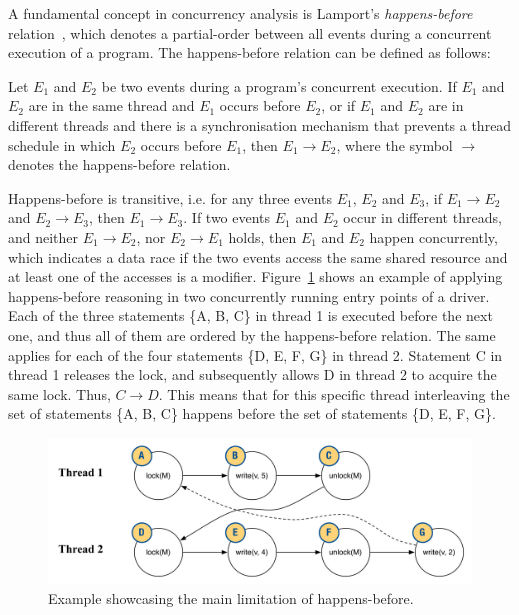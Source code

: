 A fundamental concept in concurrency analysis is Lamport's \emph{happens-before} relation~\cite{lamport1978time}, which denotes a partial-order between all events during a concurrent execution of a program. The happens-before relation can be defined as follows:

\begin{definition}
\label{definition:datarace}
Let $E_1$ and $E_2$ be two events during a program's concurrent execution. If $E_1$ and $E_2$ are in the same thread and $E_1$ occurs before $E_2$, or if $E_1$ and $E_2$ are in different threads and there is a synchronisation mechanism that prevents a thread schedule in which $E_2$ occurs before $E_1$, then $E_1 \rightarrow E_2$, where the symbol $\rightarrow$ denotes the happens-before relation.
\end{definition}

Happens-before is transitive, i.e. for any three events $E_1$, $E_2$ and $E_3$, if $E_1 \rightarrow E_2$ and $E_2 \rightarrow E_3$, then $E_1 \rightarrow E_3$. If two events $E_1$ and $E_2$ occur in different threads, and neither $E_1 \rightarrow E_2$, nor $E_2 \rightarrow E_1$ holds, then $E_1$ and $E_2$ happen concurrently, which indicates a data race if the two events access the same shared resource and at least one of the accesses is a modifier. Figure~\ref{happens_before} shows an example of applying happens-before reasoning in two concurrently running entry points of a driver. Each of the three statements \{A, B, C\} in thread 1 is executed before the next one, and thus all of them are ordered by the happens-before relation. The same applies for each of the four statements \{D, E, F, G\} in thread 2. Statement C in thread 1 releases the lock, and subsequently allows D in thread 2 to acquire the same lock. Thus, $C \rightarrow D$. This means that for this specific thread interleaving the set of statements \{A, B, C\} happens before the set of statements \{D, E, F, G\}.

\begin{figure}[htbp]
\centering
\includegraphics[width=.95\linewidth]{img/happens_before.pdf}
\caption{Example showcasing the main limitation of happens-before.}
\label{happens_before}
\end{figure}

